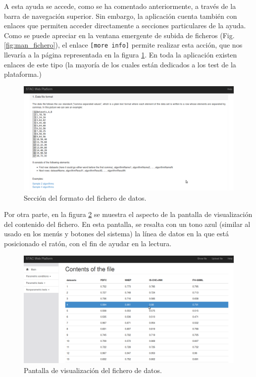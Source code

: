 A esta ayuda se accede, como se ha comentado anteriormente, a través de la barra de navegación superior. Sin embargo, la aplicación cuenta también con enlaces que permiten acceder directamente a secciones particulares de la ayuda. Como se puede apreciar en la ventana emergente de subida de ficheros (Fig. \ref{fig:man_fichero}), el enlace \texttt{[more info]} permite realizar esta acción, que nos llevaría a la página representada en la figura \ref{fig:man_ayuda2}. En toda la aplicación existen enlaces de este tipo (la mayoría de los cuales están dedicados a los test de la plataforma.)

\begin{figure}[H]
\centering
\includegraphics[scale=0.4]{figuras/man_ayuda2.png}
\caption{Sección del formato del fichero de datos.}
\label{fig:man_ayuda2}
\end{figure}

Por otra parte, en la figura \ref{fig:man_consulta} se muestra el aspecto de la pantalla de visualización del contenido del fichero. En esta pantalla, se resalta con un tono azul (similar al usado en los menús y botones del sistema) la línea de datos en la que está posicionado el ratón, con el fin de ayudar en la lectura.

\begin{figure}[H]
\centering
\includegraphics[scale=0.4]{figuras/man_consulta.png}
\caption{Pantalla de visualización del fichero de datos.}
\label{fig:man_consulta}
\end{figure}

